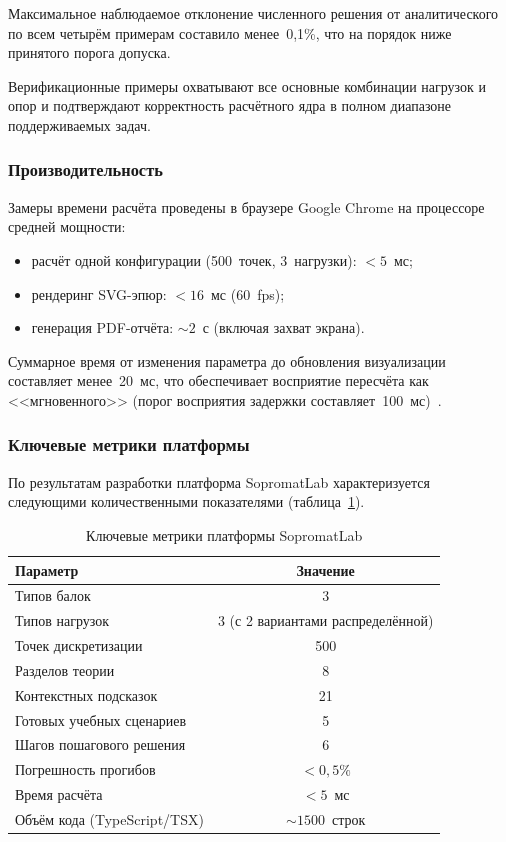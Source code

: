 Максимальное наблюдаемое отклонение численного решения от аналитического по всем четырём примерам составило менее~0{,}1\%, что на порядок ниже принятого порога допуска.

Верификационные примеры охватывают все основные комбинации нагрузок и опор и подтверждают корректность расчётного ядра в полном диапазоне поддерживаемых задач.

\subsubsection{Производительность}

Замеры времени расчёта проведены в браузере Google Chrome на процессоре средней мощности:
\begin{itemize}
  \item расчёт одной конфигурации (500~точек, 3~нагрузки): $< 5$~мс;
  \item рендеринг SVG-эпюр: $< 16$~мс (60~fps);
  \item генерация PDF-отчёта: $\sim 2$~с (включая захват экрана).
\end{itemize}

Суммарное время от изменения параметра до обновления визуализации составляет менее~20~мс, что обеспечивает восприятие пересчёта как <<мгновенного>> (порог восприятия задержки составляет~100~мс)~\cite{flanagan2020}.

\subsubsection{Ключевые метрики платформы}

По результатам разработки платформа SopromatLab характеризуется следующими количественными показателями (таблица~\ref{tab:metrics}).

\begin{table}[H]
\caption{Ключевые метрики платформы SopromatLab}\label{tab:metrics}
\begin{tabularx}{\textwidth}{|X|c|}
\hline
\textbf{Параметр} & \textbf{Значение} \\
\hline
Типов балок & 3 \\
\hline
Типов нагрузок & 3 (с 2 вариантами распределённой) \\
\hline
\hline
Точек дискретизации & 500 \\
\hline
Разделов теории & 8 \\
\hline
Контекстных подсказок & 21 \\
\hline
Готовых учебных сценариев & 5 \\
\hline
Шагов пошагового решения & 6 \\
\hline
Погрешность прогибов & $< 0{,}5\%$ \\
\hline
Время расчёта & $< 5$~мс \\
\hline
Объём кода (TypeScript/TSX) & $\sim 1500$~строк \\
\hline
\end{tabularx}
\end{table}

